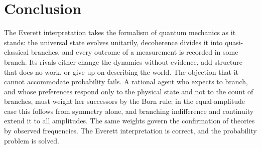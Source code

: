 \documentclass{situationist-preprint}
\begin{document}
\section{Conclusion}

The Everett interpretation takes the formalism of quantum mechanics as it stands: the universal state evolves unitarily, decoherence divides it into quasi-classical branches, and every outcome of a measurement is recorded in some branch. Its rivals either change the dynamics without evidence, add structure that does no work, or give up on describing the world. The objection that it cannot accommodate probability fails. A rational agent who expects to branch, and whose preferences respond only to the physical state and not to the count of branches, must weight her successors by the Born rule; in the equal-amplitude case this follows from symmetry alone, and branching indifference and continuity extend it to all amplitudes. The same weights govern the confirmation of theories by observed frequencies. The Everett interpretation is correct, and the probability problem is solved.
\end{document}

